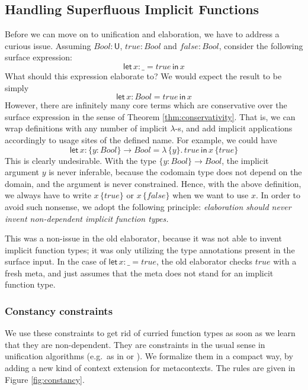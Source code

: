 \documentclass[acmsmall,review,anonymous,prologue,dvipsnames]{acmart}\settopmatter{printfolios=true,printccs=false,printacmref=false}
\newcommand{\slet}{\boldsymbol{\mathsf{let}}}
\renewcommand{\sin}{\boldsymbol{\mathsf{in}}}
\renewcommand{\U}{\mathsf{U}}
\newcommand{\mi}[1]{\mathit{#1}}
\theoremstyle{remark}
\begin{document}
\subsection{Handling Superfluous Implicit Functions}\label{sec:superfluous}

Before we can move on to unification and elaboration, we have to address
a curious issue. Assuming $\mi{Bool} : \U$, $\mi{true} : \mi{Bool}$ and $\mi{false} : \mi{Bool}$,
consider the following surface expression:
\[
  \slet\,x : \_ = \mi{true}\,\sin\,x
\]
What should this expression elaborate to? We would expect the result to be simply
\[
  \slet\,x : \mi{Bool} = \mi{true}\,\sin\,x
\]
However, there are infinitely many core terms which are conservative over the
surface expression in the sense of Theorem \ref{thm:conservativity}. That is, we
can wrap definitions with any number of implicit $\lambda$-s, and add implicit
applications accordingly to usage sites of the defined name. For example, we could have
\[
  \slet\,x : \{y : \mi{Bool}\} \to \mi{Bool} = \lambda\,\{y\}.\,\mi{true}\,\sin\,x\,\{\mi{true}\}
\]
This is clearly undesirable. With the type $\{y : Bool\} \to Bool$, the implicit
argument $y$ is never inferable, because the codomain type does not depend on
the domain, and the argument is never constrained. Hence, with the above
definition, we always have to write $x\,\{\mi{true}\}$ or $x\,\{\mi{false}\}$ when we want
to use $x$. In order to avoid such nonsense, we adopt the following principle:
\emph{elaboration should never invent non-dependent implicit function types.}

This was a non-issue in the old elaborator, because it was not able to invent
implicit function types; it was only utilizing the type annotations present in
the surface input. In the case of $\slet\,x : \_ = \mi{true}$, the old elaborator
checks $\mi{true}$ with a fresh meta, and just assumes that the meta does not stand
for an implicit function type.

\subsubsection{Constancy constraints}
We use these constraints to get rid of curried function types as soon as we
learn that they are non-dependent. They are constraints in the usual sense in
unification algorithms (e.g.\ as in \cite{abel2011higher} or
\cite{vytiniotis2011outsidein}). We formalize them in a compact way, by adding a
new kind of context extension for metacontexts. The rules are given in Figure
\ref{fig:constancy}.
\end{document}
